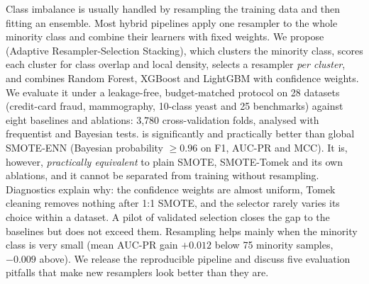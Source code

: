 Class imbalance is usually handled by resampling the training data and then fitting an ensemble. Most hybrid
pipelines apply one resampler to the whole minority class and combine their learners with fixed weights. We
propose \ars{} (Adaptive Resampler-Selection Stacking), which clusters the minority class, scores each cluster
for class overlap and local density, selects a resampler \emph{per cluster}, and combines Random Forest, XGBoost and
LightGBM with confidence weights. We evaluate it under a leakage-free, budget-matched protocol on 28 datasets
(credit-card fraud, mammography, 10-class yeast and 25 benchmarks) against eight baselines and ablations: 3,780
cross-validation folds, analysed with frequentist and Bayesian tests. \ars{} is significantly and practically better
than global SMOTE-ENN (Bayesian probability $\geq 0.96$ on F1, AUC-PR and MCC). It is, however, \emph{practically
equivalent} to plain SMOTE, SMOTE-Tomek and its own ablations, and it cannot be separated from training without
resampling. Diagnostics explain why: the confidence weights are almost uniform, Tomek cleaning removes nothing after
1:1 SMOTE, and the selector rarely varies its choice within a dataset. A pilot of validated selection closes the gap
to the baselines but does not exceed them. Resampling helps mainly when the minority class is very small (mean
AUC-PR gain $+0.012$ below 75 minority samples, $-0.009$ above). We release the reproducible pipeline and discuss
five evaluation pitfalls that make new resamplers look better than they are.
